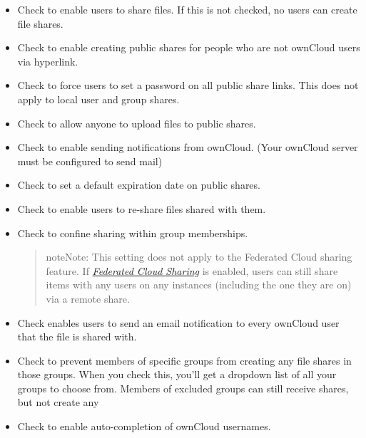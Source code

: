 \documentclass[letterpaper,10pt,english]{sphinxmanual}
\begin{document}
\begin{itemize}
\item {} 
Check  to enable users to share files. If
this is not checked, no users can create file shares.

\item {} 
Check  to enable creating public shares for
people who are not ownCloud users via hyperlink.

\item {} 
Check  to force users to set a password on all
public share links. This does not apply to local user and group shares.

\item {} 
Check  to allow anyone to upload files to
public shares.

\item {} 
Check  to enable
sending notifications from ownCloud. (Your ownCloud server must be configured
to send mail)

\item {} 
Check  to set a default expiration date on
public shares.

\item {} 
Check  to enable users to re-share files shared with them.

\item {} 
Check  to confine
sharing within group memberships.
\begin{quote}

\begin{notice}{note}{Note:}
This setting does not apply to the Federated Cloud sharing
feature. If {\hyperref[configuration_files/federated_cloud_sharing_configuration::doc]{\emph{Federated Cloud Sharing}}} is
enabled, users can still share items with any users on any instances
(including the one they are on) via a remote share.
\end{notice}
\end{quote}

\item {} 
Check  enables
users to send an email notification to every ownCloud user that the file is
shared with.

\item {} 
Check  to prevent members of specific groups
from creating any file shares in those groups. When you check this, you'll
get a dropdown list of all your groups to choose from. Members of excluded
groups can still receive shares, but not create any

\item {} 
Check  to enable
auto-completion of ownCloud usernames.

\end{itemize}
\end{document}
